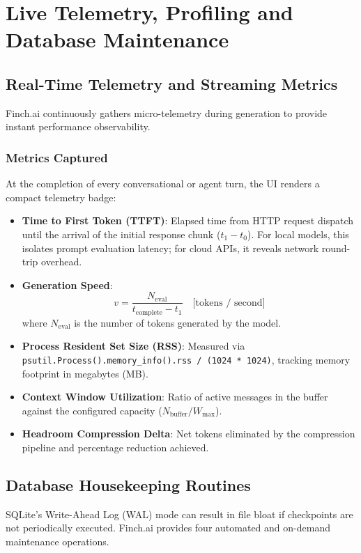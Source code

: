 \chapter{Live Telemetry, Profiling and Database Maintenance}
\label{chap:telemetry_maintenance}

\section{Real-Time Telemetry and Streaming Metrics}
Finch.ai continuously gathers micro-telemetry during generation to provide instant performance observability.

\subsection{Metrics Captured}
At the completion of every conversational or agent turn, the UI renders a compact telemetry badge:
\begin{itemize}
    \item \textbf{Time to First Token (TTFT)}: Elapsed time from HTTP request dispatch until the arrival of the initial response chunk ($t_1 - t_0$). For local models, this isolates prompt evaluation latency; for cloud APIs, it reveals network round-trip overhead.
    \item \textbf{Generation Speed}:
    \begin{equation}
        v = \frac{N_{\text{eval}}}{t_{\text{complete}} - t_1} \quad \text{[tokens / second]}
    \end{equation}
    where $N_{\text{eval}}$ is the number of tokens generated by the model.
    \item \textbf{Process Resident Set Size (RSS)}: Measured via \texttt{psutil.Process().memory\_info().rss / (1024 * 1024)}, tracking memory footprint in megabytes (MB).
    \item \textbf{Context Window Utilization}: Ratio of active messages in the buffer against the configured capacity ($N_{\text{buffer}} / W_{\max}$).
    \item \textbf{Headroom Compression Delta}: Net tokens eliminated by the compression pipeline and percentage reduction achieved.
\end{itemize}

\section{Database Housekeeping Routines}
SQLite's Write-Ahead Log (WAL) mode can result in file bloat if checkpoints are not periodically executed. Finch.ai provides four automated and on-demand maintenance operations.

